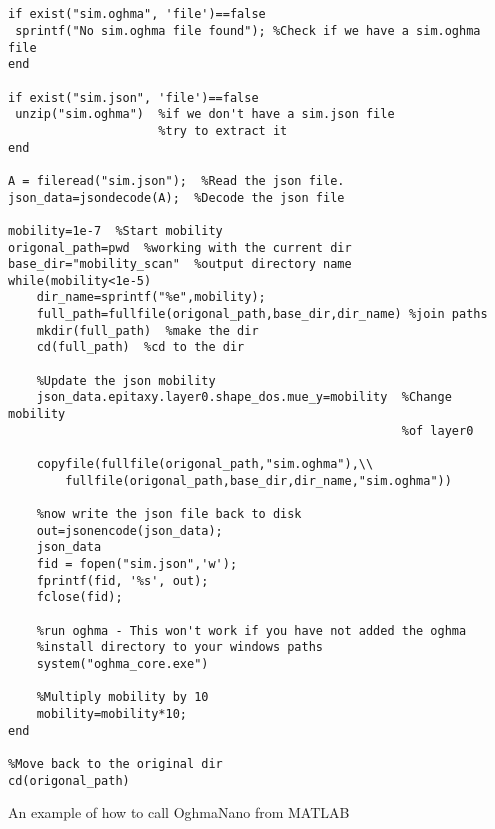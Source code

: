 \begin{listing}
\begin{verbatim}


if exist("sim.oghma", 'file')==false
 sprintf("No sim.oghma file found"); %Check if we have a sim.oghma file
end

if exist("sim.json", 'file')==false
 unzip("sim.oghma")  %if we don't have a sim.json file
					 %try to extract it
end

A = fileread("sim.json");  %Read the json file.
json_data=jsondecode(A);  %Decode the json file

mobility=1e-7  %Start mobility
origonal_path=pwd  %working with the current dir
base_dir="mobility_scan"  %output directory name
while(mobility<1e-5)
    dir_name=sprintf("%e",mobility);
    full_path=fullfile(origonal_path,base_dir,dir_name)	%join paths
    mkdir(full_path)  %make the dir
    cd(full_path)  %cd to the dir

	%Update the json mobility
    json_data.epitaxy.layer0.shape_dos.mue_y=mobility  %Change mobility
													   %of layer0
    
    copyfile(fullfile(origonal_path,"sim.oghma"),\\
		fullfile(origonal_path,base_dir,dir_name,"sim.oghma"))

	%now write the json file back to disk
    out=jsonencode(json_data);
    json_data
    fid = fopen("sim.json",'w');
    fprintf(fid, '%s', out);
    fclose(fid);

	%run oghma - This won't work if you have not added the oghma
	%install directory to your windows paths 
    system("oghma_core.exe")
    
	%Multiply mobility by 10
    mobility=mobility*10;
end

%Move back to the original dir
cd(origonal_path)

\end{verbatim}
\caption{An example of how to call OghmaNano from MATLAB} 
\label{matlab-example}
\end{listing}
